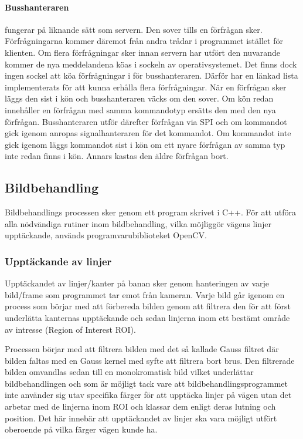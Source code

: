 \documentclass[tekniskrapport/tech.tex]{subfiles}
\begin{document}
\paragraph{Busshanteraren} fungerar på liknande sätt som servern. Den sover
tills en förfrågan sker. Förfrågningarna kommer däremot från andra trådar i
programmet istället för klienten. Om flera förfrågningar sker innan servern har
utfört den nuvarande kommer de nya meddelandena köas i sockeln av
operativsystemet. Det finns dock ingen sockel att köa förfrågningar i för
busshanteraren. Därför har en länkad lista implementerats för att kunna erhålla
flera förfrågningar. När en förfrågan sker läggs den sist i kön och
busshanteraren väcks om den sover. Om kön redan innehåller en förfrågan med
samma kommandotyp ersätts den med den nya förfrågan. Busshanteraren utför
därefter förfrågan via SPI och om kommandot gick igenom anropas
signalhanteraren för det kommandot. Om kommandot inte gick igenom läggs
kommandot sist i kön om ett nyare förfrågan av samma typ inte redan finns i
kön. Annars kastas den äldre förfrågan bort.

\subsection{Bildbehandling}
Bildbehandlings processen sker genom ett program skrivet i C++. För att utföra
alla nödvändiga rutiner inom bildbehandling, vilka möjliggör vägens linjer
upptäckande, används programvarubiblioteket OpenCV.

\subsubsection{Upptäckande av linjer}
Upptäckandet av linjer/kanter på banan sker genom hanteringen av varje
bild/frame som programmet tar emot från kameran. Varje bild går igenom en
process som börjar med att förbereda bilden genom att filtrera den för att
först underlätta kanternas upptäckande och sedan linjerna inom ett bestämt
område av intresse (Region of Interest ROI).

Processen börjar med att filtrera bilden med det så kallade Gauss filtret där
bilden faltas med en Gauss kernel med syfte att filtrera bort brus. Den
filtrerade bilden omvandlas sedan till en monokromatisk bild vilket underlättar
bildbehandlingen och som är möjligt tack vare att bildbehandlingsprogrammet
inte använder sig utav specifika färger för att upptäcka linjer på vägen utan
det arbetar med de linjerna inom ROI och klassar dem enligt deras lutning och
position. Det här innebär att upptäckandet av linjer ska vara möjligt utfört
oberoende på vilka färger vägen kunde ha. 
\end{document}
